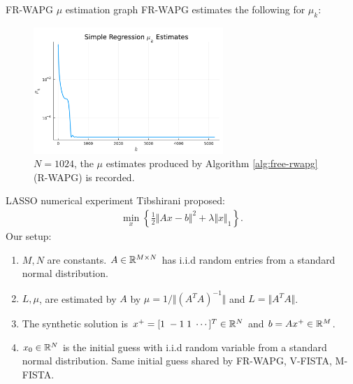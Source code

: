 \documentclass[11pt]{beamer}
\theoremstyle{definition}
\begin{document}
        \begin{frame}{FR-WAPG $\mu$ estimation graph}
            FR-WAPG estimates the following for $\mu_k$: 
            \begin{figure}[H]
                \centering
                \includegraphics[width=0.64\textwidth]{assets/simple_regression_loss_sc_estimates_1024.png}
                \caption{$N = 1024$, the $\mu$ estimates produced by Algorithm \ref{alg:free-rwapg} (R-WAPG) is recorded. }
                \label{fig:simple-quadratic-r-wapg-mu-estimates}
            \end{figure}
        \end{frame}
        \begin{frame}{LASSO numerical experiment}
            Tibshirani \cite{tibshirani_regression_1996} proposed: 
            \begin{align*}
                \min_x
                \left\lbrace
                    \frac{1}{2}\Vert Ax - b\Vert^2 + \lambda\Vert x\Vert_1
                \right\rbrace. 
            \end{align*}
            Our setup: 
            \begin{enumerate}
                \item $M, N$ are constants. $A \in \mathbb R^{M\times N}$ has i.i.d random entries from a standard normal distribution. 
                \item $L, \mu$, are estimated by $A$ by $\mu = 1/\Vert (A^TA)^{-1}\Vert$ and $L = \Vert A^TA\Vert$. 
                \item The synthetic solution is $x^+ = [1\; -1\; 1 \; \cdots ]^T \in \mathbb R^N$ and $b = Ax^+ \in \mathbb R^M$.
                \item $x_0\in \mathbb R^N$ is the initial guess with i.i.d random variable from a standard normal distribution. Same initial guess shared by FR-WAPG, V-FISTA, M-FISTA. 
            \end{enumerate}
        \end{frame}
\end{document}

